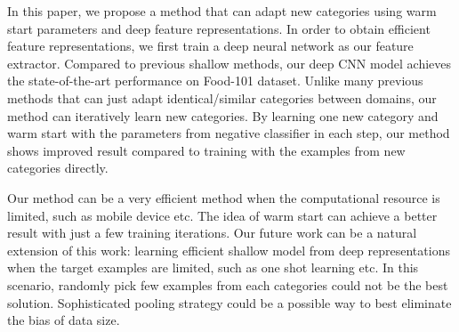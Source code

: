 In this paper, we propose a method that can adapt new categories using warm start parameters and deep feature representations. In order to obtain efficient feature representations, we first train a deep neural network as our feature extractor. Compared to previous shallow methods, our deep CNN model achieves the state-of-the-art performance on Food-101 dataset. Unlike many previous methods that can just adapt identical/similar categories between domains,  our method can iteratively learn new categories. By learning one new category and warm start with the parameters from negative classifier in each step, our method shows improved result compared to training with the examples from new categories directly.

Our method can be a very efficient method when the computational resource is limited, such as mobile device etc. The idea of warm start can achieve a better result with just a few training iterations. Our future work can be a natural extension of this work: learning efficient shallow model from deep representations when the target examples are limited, such as one shot learning etc. In this scenario, randomly pick few examples from each categories could not be the best solution. Sophisticated pooling strategy could be a possible way to best eliminate the bias of data size.

